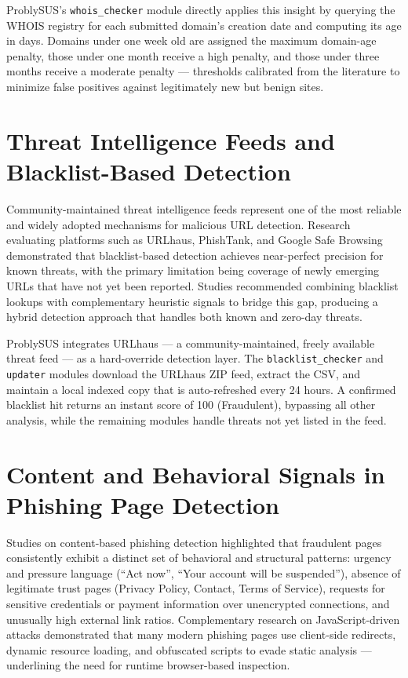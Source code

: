 ProblySUS's \texttt{whois\_checker} module directly applies this insight by querying the WHOIS registry for each submitted domain's creation date and computing its age in days. Domains under one week old are assigned the maximum domain-age penalty, those under one month receive a high penalty, and those under three months receive a moderate penalty — thresholds calibrated from the literature to minimize false positives against legitimately new but benign sites.

\section{Threat Intelligence Feeds and Blacklist-Based Detection}

Community-maintained threat intelligence feeds represent one of the most reliable and widely adopted mechanisms for malicious URL detection. Research evaluating platforms such as URLhaus, PhishTank, and Google Safe Browsing demonstrated that blacklist-based detection achieves near-perfect precision for known threats, with the primary limitation being coverage of newly emerging URLs that have not yet been reported. Studies recommended combining blacklist lookups with complementary heuristic signals to bridge this gap, producing a hybrid detection approach that handles both known and zero-day threats.

ProblySUS integrates URLhaus — a community-maintained, freely available threat feed — as a hard-override detection layer. The \texttt{blacklist\_checker} and \texttt{updater} modules download the URLhaus ZIP feed, extract the CSV, and maintain a local indexed copy that is auto-refreshed every 24 hours. A confirmed blacklist hit returns an instant score of 100 (Fraudulent), bypassing all other analysis, while the remaining modules handle threats not yet listed in the feed.

\section{Content and Behavioral Signals in Phishing Page Detection}

Studies on content-based phishing detection highlighted that fraudulent pages consistently exhibit a distinct set of behavioral and structural patterns: urgency and pressure language (``Act now'', ``Your account will be suspended''), absence of legitimate trust pages (Privacy Policy, Contact, Terms of Service), requests for sensitive credentials or payment information over unencrypted connections, and unusually high external link ratios. Complementary research on JavaScript-driven attacks demonstrated that many modern phishing pages use client-side redirects, dynamic resource loading, and obfuscated scripts to evade static analysis — underlining the need for runtime browser-based inspection.

